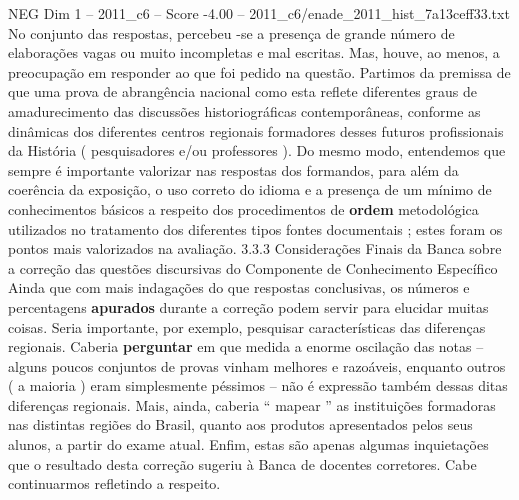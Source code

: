 \begin{textsample}{NEG Dim 1 – 2011\_c6 – Score -4.00 – 2011\_c6/enade\_2011\_hist\_7a13ceff33.txt}
No conjunto das respostas, percebeu -se a presença de grande número de elaborações vagas ou muito incompletas e mal escritas.
Mas, houve, ao menos, a preocupação em responder ao que foi pedido na questão.
Partimos da premissa de que uma prova de abrangência nacional como esta reflete diferentes graus de amadurecimento das discussões historiográficas contemporâneas, conforme as dinâmicas dos diferentes centros regionais formadores desses futuros profissionais da História ( pesquisadores e/ou professores ).
Do mesmo modo, entendemos que sempre é importante valorizar nas respostas dos formandos, para além da coerência da exposição, o uso correto do idioma e a presença de um mínimo de conhecimentos básicos a respeito dos procedimentos de \textbf{ordem} metodológica utilizados no tratamento dos diferentes tipos fontes documentais ; estes foram os pontos mais valorizados na avaliação. 3.3.3 Considerações Finais da Banca sobre a correção das questões discursivas do Componente de Conhecimento Específico Ainda que com mais indagações do que respostas conclusivas, os números e percentagens \textbf{apurados} durante a correção podem servir para elucidar muitas coisas.
Seria importante, por exemplo, pesquisar características das diferenças regionais.
Caberia \textbf{perguntar} em que medida a enorme oscilação das notas – alguns poucos conjuntos de provas vinham melhores e razoáveis, enquanto outros ( a maioria ) eram simplesmente péssimos – não é expressão também dessas ditas diferenças regionais.
Mais, ainda, caberia “ mapear ” as instituições formadoras nas distintas regiões do Brasil, quanto aos produtos apresentados pelos seus alunos, a partir do exame atual.
Enfim, estas são apenas algumas inquietações que o resultado desta correção sugeriu à Banca de docentes corretores.
Cabe continuarmos refletindo a respeito.

\end{textsample}
